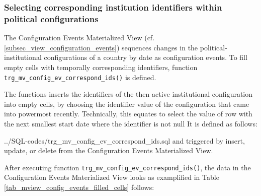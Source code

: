 \subsubsection{Selecting corresponding institution identifiers within political configurations}\label{subsubsec_trg_mv_config_ev_corresponding_ids}
The Configuration Events Materialized View (cf. \ref{subsec_view_configuration_events}) sequences changes in the political-institutional configurations of a country by date as configuration events.
To fill empty cells with temporally corresponding identifiers, function \texttt{trg\_mv\_config\_ev\_correspond\_ids()} is defined.

The functions inserts the identifiers of the then active institutional configuration into empty cells, by choosing the identifier value of the configuration that came into powermost recently. 
Technically, this equates to select the value of row with the next smallest start date where the identifier is not null
It is defined as follows:

%
{../SQL-codes/trg_mv_config_ev_correspond_ids.sql}
and triggered by insert, update, or delete from the Configuration Events Materialized View.%

After executing function \texttt{trg\_mv\_config\_ev\_correspond\_ids()}, the data in the Configuration Events Materialized View looks as examplified in Table \ref{tab_mview_config_events_filled_cells} follows:

